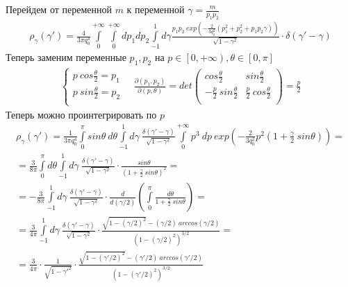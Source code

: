 \documentclass[12pt]{article}
\renewcommand{\l}{\left( }
\renewcommand{\r}{\right) }
\newcommand{\pd}{\partial}
\newcommand{\br}[1]{\l {#1} \r}
\newcommand{\jacobian}[2]{\frac{\pd \br{#1}}{\pd \br{#2}}}
\begin{document}
Перейдем от переменной $m$ к переменной $\gamma = \frac{m}{p_1 p_2}$
\begin{gather}
\rho_\gamma \br{\gamma'} = \frac{4}{3 \pi q_0^4} \int\limits_0^{+\infty} \int\limits_0^{+\infty} dp_1 dp_2 \int\limits_{-1}^{1} d\gamma \frac{p_1 p_2 \ exp \br{-\frac{2}{3q_0^2}\br{p_1^2 + p_2^2 + p_1 p_2 \gamma}}}{\sqrt{1 - \gamma^2}} \cdot \delta \br{\gamma' - \gamma}
\end{gather}
Теперь заменим переменные $p_1, p_2$ на $p \in \left[ 0, +\infty \r, \theta \in \left[ 0, \pi \right]$
\begin{gather}
\begin{cases}
p \ cos \frac{\theta}{2} = p_1 \\
p \ sin \frac{\theta}{2} = p_2 \\
\end{cases} \quad
\jacobian{p_1, p_2}{p, \theta} = det
\begin{pmatrix}
cos \frac{\theta}{2} & sin \frac{\theta}{2} \\
- \frac{p}{2} \ sin \frac{\theta}{2} & \frac{p}{2} \ cos \frac{\theta}{2} \\
\end{pmatrix}
= \frac{p}{2}
\end{gather}
Теперь можно проинтегрировать по $p$
\begin{gather}
\rho_\gamma \br{\gamma'} = \frac{1}{3\pi q_0^4} \int\limits_0^\pi sin \theta \ d\theta \int\limits_{-1}^1 d\gamma \ \frac{\delta \br{\gamma' - \gamma}}{\sqrt{1 - \gamma^2}} \int\limits_0^{+\infty} p^3 \ dp \ exp \br{-\frac{2}{3q_0^2} p^2 \br{1 + \frac{\gamma}{2} \ sin \theta}} = \nonumber \\
= \frac{3}{8 \pi} \int\limits_0^\pi d\theta \int\limits_{-1}^1 d\gamma \ \frac{\delta \br{\gamma' - \gamma}}{\sqrt{1 - \gamma^2}} \cdot \frac{sin \theta}{\br{1 + \frac{\gamma}{2} \ sin \theta}^2} = \nonumber \\
= -\frac{3}{8 \pi} \int\limits_{-1}^1 d\gamma \ \frac{\delta \br{\gamma' - \gamma}}{\sqrt{1 - \gamma^2}} \cdot \frac{d}{d \br{\gamma / 2}} \br{\int\limits_0^\pi \frac{d\theta}{1 + \frac{\gamma}{2} \ sin \theta}} = \nonumber \\
= \frac{3}{4 \pi} \int\limits_{-1}^1 d\gamma \ \frac{\delta \br{\gamma' - \gamma}}{\sqrt{1 - \gamma^2}} \cdot   \frac{\sqrt{1 - \br{\gamma / 2}^2} - \br{\gamma / 2} \ arccos \br{\gamma / 2}}{\br{1 - \br{\gamma/2}^2}^{3/2}} = \nonumber \\
= \frac{3}{4 \pi} \cdot \frac{1}{\sqrt{1 - \gamma'^2}} \cdot   \frac{\sqrt{1 - \br{\gamma' / 2}^2} - \br{\gamma' / 2} \ arccos \br{\gamma' / 2}}{\br{1 - \br{\gamma'/2}^2}^{3/2}}
\end{gather}
\end{document}
